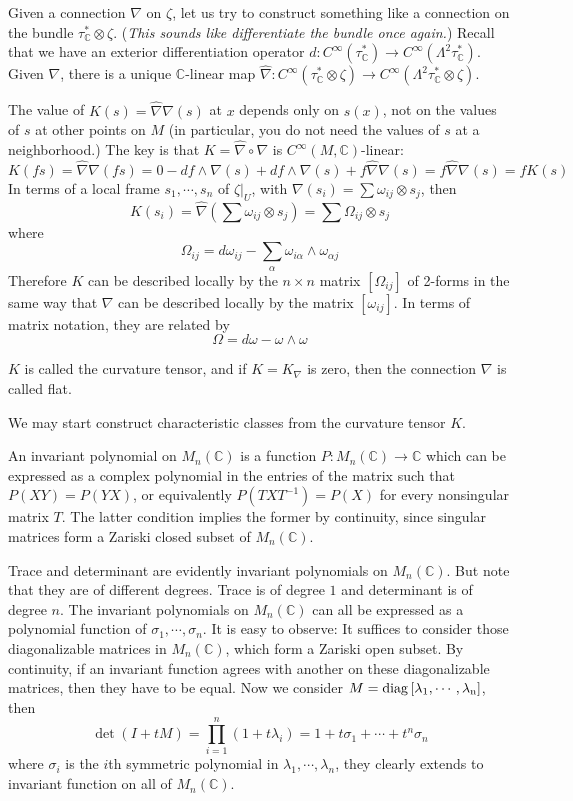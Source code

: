 \documentclass[12pt]{article}
\theoremstyle{plain}
\theoremstyle{definition}
\newcommand{\IC}{\mathbb{C}}
\newcommand{\diag}{\rm diag\,}
\newcommand\tensor{{\otimes}}
\newcommand{\<}{\langle}
\renewcommand{\>}{\rangle}
\def\what{\widehat}
\newcommand{\w}{\omega}
\newcommand{\Ohm}{\Omega}
\begin{document}
Given a connection $\nabla$ on $\zeta$, let us try to construct something like a connection on the bundle $\tau_\IC^* \tensor \zeta$. (\textit{This sounds like differentiate the bundle once again.}) Recall that we have an exterior differentiation operator $d : C^\infty(\tau_\IC^*) \to C^\infty(\Lambda^2 \tau_\IC^*)$. Given $\nabla$, there is a unique $\IC$-linear map $\what{\nabla} : C^\infty(\tau_\IC^* \tensor \zeta) \to C^\infty(\Lambda^2 \tau_\IC^* \tensor \zeta)$. 

The value of $K(s) = \what{\nabla} \nabla (s)$ at $x$ depends only on $s(x)$, not on the values of $s$ at other points on $M$ (in particular, you do not need the values of $s$ at a neighborhood.) The key is that $K =  \what{\nabla} \circ \nabla$ is $C^\infty(M, \IC)$-linear: 
$$ K(fs) =  \what{\nabla} \nabla(fs) = 0 - df \wedge \nabla(s) + df \wedge
\nabla(s) + f  \what{\nabla} \nabla(s) =  f \what{\nabla} \nabla(s) = fK(s)$$
In terms of a local frame $s_1, \cdots, s_n$ of $\zeta|_U$, with $\nabla(s_i) = \sum \w_{ij} \tensor s_j$, then 
$$ K(s_i) = \what{\nabla}(\sum \w_{ij} \tensor s_j) = \sum \Ohm_{ij} \tensor s_j $$ 
where 
$$ \Ohm_{ij} = d \w_{ij} - \sum_\alpha \w_{i \alpha} \wedge \w_{\alpha j} $$
Therefore $K$ can be described locally by the $n \times n$ matrix $[\Ohm_{ij}]$ of 2-forms in the same way that $\nabla$ can be described locally by the matrix $[\w_{ij}]$. In terms of matrix notation, they are related by $$ \Ohm = d \w - \w \wedge \w $$

$K$ is called the curvature tensor, and if $K = K_\nabla$ is zero, then the connection $\nabla$ is called flat. 

We may start construct characteristic classes from the curvature tensor $K$. 

An invariant polynomial on $M_n(\IC)$ is a function $P : M_n(\IC) \to \IC$ which can be expressed as a complex polynomial in the entries of the matrix such that $P(XY) = P(YX)$, or equivalently $P(TXT^{-1}) = P(X)$ for every nonsingular matrix $T$. The latter condition implies the former by continuity, since singular matrices form a Zariski closed subset of $M_n(\IC)$. 

Trace and determinant are evidently invariant polynomials on $M_n(\IC)$. But note that they are of different degrees. Trace is of degree $1$ and determinant is of degree $n$. The invariant polynomials on $M_n(\IC)$ can all be expressed as a polynomial function of $\sigma_1, \cdots, \sigma_n$. It is easy to observe: It suffices to consider those diagonalizable matrices in $M_n(\IC)$, which form a Zariski open subset. By continuity, if an invariant function agrees with another on these diagonalizable matrices, then they have to be equal. Now we consider $M = \diag[\lambda_1, \cdots, \lambda_n]$, then $$ \det(I + tM) = \prod_{i = 1}^n (1 + t\lambda_i) = 1 + t \sigma_1  + \cdots + t^n \sigma_n$$ where $\sigma_i$ is the $i$th symmetric polynomial in $\lambda_1, \cdots, \lambda_n$, they clearly extends to invariant function on all of $M_n(\IC)$. 
\end{document}

